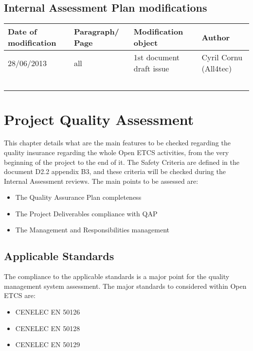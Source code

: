 \documentclass{template/openetcs_article}
\begin{document}
\subsection{Internal Assessment Plan modifications}
\begin{tabular}{|p{2cm}|p{2cm}|p{6cm}|p{3cm}|} 
\hline
\textbf{Date of modification} & \textbf{Paragraph/ Page} & \textbf{Modification object} & \textbf{Author} \\ \hline
28/06/2013 & all & 1st document draft issue & Cyril Cornu (All4tec) \\ \hline
 & & & \\ \hline
 & & & \\ \hline
 & & & \\ \hline
 & & & \\ \hline
 & & & \\ \hline
\end{tabular}

\newpage
\section{Project Quality Assessment}
This chapter details what are the main features to be checked regarding the quality insurance regarding the whole Open ETCS activities, from the very beginning of the project to the end of it.
The Safety Criteria are defined in the document D2.2 appendix B3, and these criteria will be checked during the Internal Assessment reviews. The main points to be assessed are:
\begin{itemize}
\item The Quality Assurance Plan completeness
\item The Project Deliverables compliance with QAP
\item The Management and Responsibilities management 
\end{itemize}

\subsection{Applicable Standards}
The compliance to the applicable standards is a major point for the quality management system assessment.
The major standards to considered within Open ETCS are:
\begin{itemize}
\item CENELEC EN 50126
\item CENELEC EN 50128
\item CENELEC EN 50129
\end{itemize}
\end{document}
